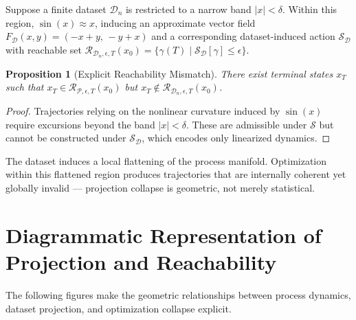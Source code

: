 \documentclass[12pt]{article}
\theoremstyle{plain}
\newtheorem{proposition}[theorem]{Proposition}
\theoremstyle{definition}
\theoremstyle{remark}
\begin{document}
Suppose a finite dataset $\mathcal{D}_n$ is restricted to a narrow band $|x| < \delta$. Within this region, $\sin(x) \approx x$, inducing an approximate vector field $F_{\mathcal{D}}(x,y) = (-x+y,\,-y+x)$ and a corresponding dataset-induced action $\mathcal{S}_{\mathcal{D}}$ with reachable set $\mathcal{R}_{\mathcal{D}_n,\epsilon,T}(x_0) = \{\gamma(T) \mid \mathcal{S}_{\mathcal{D}}[\gamma] \le \epsilon\}$.

\begin{proposition}[Explicit Reachability Mismatch]
There exist terminal states $x_T$ such that $x_T \in \mathcal{R}_{\mathcal{P},\epsilon,T}(x_0)$ but $x_T \notin \mathcal{R}_{\mathcal{D}_n,\epsilon,T}(x_0)$.
\end{proposition}

\begin{proof}
Trajectories relying on the nonlinear curvature induced by $\sin(x)$ require excursions beyond the band $|x| < \delta$. These are admissible under $\mathcal{S}$ but cannot be constructed under $\mathcal{S}_{\mathcal{D}}$, which encodes only linearized dynamics.
\end{proof}

The dataset induces a local flattening of the process manifold. Optimization within this flattened region produces trajectories that are internally coherent yet globally invalid — projection collapse is geometric, not merely statistical.

\section{Diagrammatic Representation of Projection and Reachability}

The following figures make the geometric relationships between process dynamics, dataset projection, and optimization collapse explicit.
\end{document}
